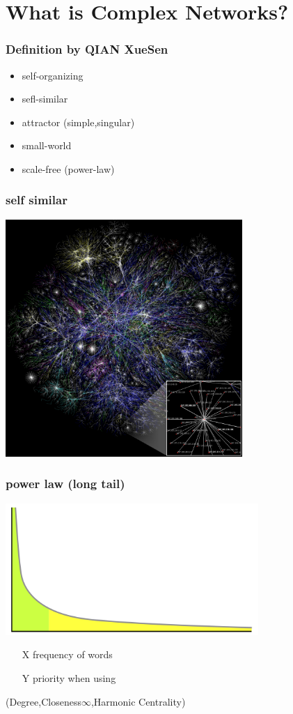 \documentclass[professionalfonts]{beamer}
\begin{document}
\section{What is Complex Networks?}

\begin{frame}
\frametitle{Definition by QIAN XueSen}
\begin{itemize}
\item self-organizing
\item sefl-similar
\item attractor (simple,singular)
\item small-world
\item scale-free (power-law)
\end{itemize}
\end{frame}


\begin{frame}
\frametitle{self similar}
\includegraphics[height=9cm]{complexnet}
\end{frame}

\begin{frame}
\frametitle{power law (long tail)}
\includegraphics[height=5cm]{powerlaw}
\begin{itemize}
\item [X] frequency of words
\item [Y] priority when using
\end{itemize}(Degree,Closeness$\infty$,Harmonic Centrality)
\end{frame}
\end{document}

